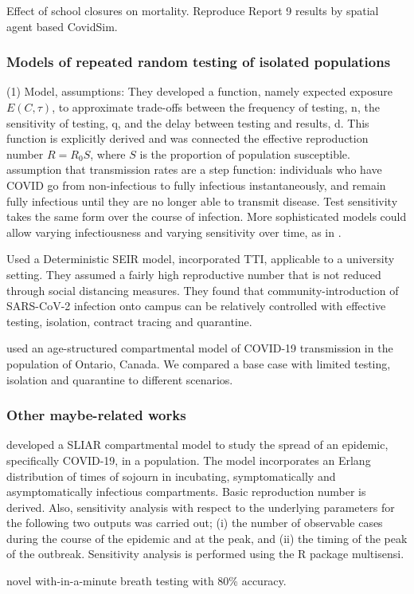 \documentclass[12pt]{article}
\theoremstyle{definition} %
\begin{document}
\citep{rice2020effect} Effect of school closures on mortality. Reproduce Report 9 results by spatial agent based CovidSim. 
\subsubsection{Models of repeated random testing of isolated populations}
\cite{bergstrom2020frequency}
(1) Model, assumptions: They developed a function, namely expected exposure $E(C,\tau)$, to approximate trade-offs between the frequency of testing, n, the sensitivity of testing, q, and the delay between
testing and results, d. This function is explicitly derived and was connected the effective reproduction number $R=R_0 S$, where $S$ is the proportion of population susceptible.
assumption that transmission rates are a step function: individuals who
have COVID go from non-infectious to fully infectious instantaneously,
and remain fully infectious until they are no longer able to transmit disease. Test sensitivity takes the same form over the course of infection.
More sophisticated models could allow varying infectiousness and varying
sensitivity over time, as in 
\citep{larremore2020test}.

\citep{lopman2020model} Used a Deterministic SEIR model, incorporated TTI, applicable to a university setting. They assumed a fairly high reproductive number that is not reduced through social
distancing measures. They found that community-introduction of SARS-CoV-2 infection onto campus can be
relatively controlled with effective testing, isolation, contract tracing and quarantine.

\citep{tuite2020mathematical} used an age-structured compartmental model of COVID-19 transmission in the population of Ontario, Canada. We compared a base case with limited testing, isolation and quarantine to different scenarios. 
\subsubsection{Other maybe-related works}
\citep{arino2020simple} developed a SLIAR compartmental model to study the spread of an epidemic, specifically COVID-19, in a population. The model incorporates an Erlang distribution of times of sojourn in incubating, symptomatically and asymptomatically infectious compartments. Basic reproduction number is derived. Also, sensitivity analysis with respect to the underlying parameters for the following two outputs was carried out; (i) the number of observable cases during the course of the epidemic and at the peak, and (ii) the timing of the peak of the outbreak. Sensitivity analysis is performed using the R package multisensi.

\citep{ruszkiewicz2020diagnosis} novel with-in-a-minute breath testing with 80\% accuracy. 
\end{document}

